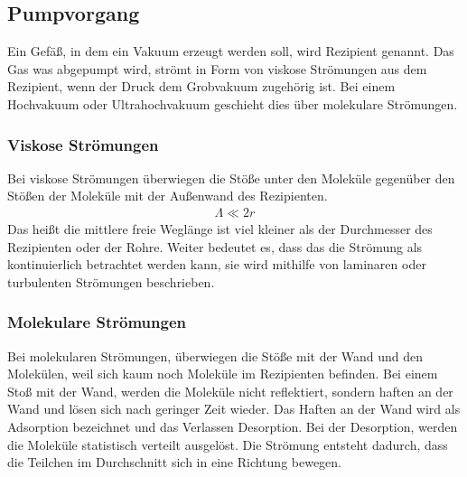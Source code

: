 \subsection{Pumpvorgang}
Ein Gefäß, in dem ein Vakuum erzeugt werden soll, wird Rezipient genannt. Das Gas was abgepumpt wird, strömt in Form von viskose Strömungen aus dem Rezipient, wenn der Druck dem Grobvakuum zugehörig ist. Bei einem Hochvakuum oder Ultrahochvakuum geschieht dies über molekulare Strömungen.
\subsubsection{Viskose Strömungen}
Bei viskose Strömungen überwiegen die Stöße unter den Moleküle gegenüber den Stößen der Moleküle mit der Außenwand des Rezipienten.
\begin{align}
 \Lambda \ll 2 r
\end{align}
Das heißt die mittlere freie Weglänge ist viel kleiner als der Durchmesser des Rezipienten oder der Rohre. Weiter bedeutet es, dass das die Strömung als kontinuierlich betrachtet werden kann, sie wird mithilfe von laminaren oder turbulenten Strömungen beschrieben.
\subsubsection{Molekulare Strömungen}
Bei molekularen Strömungen, überwiegen die Stöße mit der Wand und den Molekülen, weil sich kaum noch Moleküle im Rezipienten befinden. Bei einem Stoß mit der Wand, werden die Moleküle nicht reflektiert, sondern haften an der Wand und lösen sich nach geringer Zeit wieder. Das Haften an der Wand wird als Adsorption bezeichnet und das Verlassen Desorption.
Bei der Desorption, werden die Moleküle statistisch verteilt ausgelöst. Die Strömung entsteht dadurch, dass die Teilchen im Durchschnitt sich in eine Richtung bewegen.

